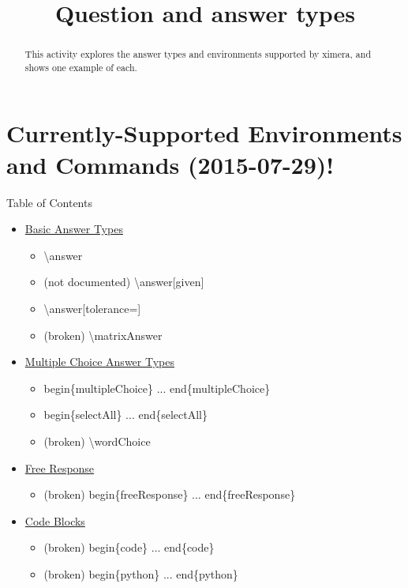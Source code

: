 \documentclass{ximera}
\title{Question and answer types}
\begin{document}
\begin{abstract}
  This activity explores the answer types and environments supported by ximera, and shows one example of each.
\end{abstract}

\maketitle

\section{Currently-Supported Environments and Commands (2015-07-29)!}

\begin{remark} Table of Contents

\begin{itemize}
\item \hyperref[BasicAnswerType]{Basic Answer Types}
  \begin{itemize}
    \item \textbackslash answer
    \item (not documented) \textbackslash answer[given]
    \item \textbackslash answer[tolerance=]
    \item (broken) \textbackslash matrixAnswer  
  \end{itemize}
\item \hyperref[MCAnswerType]{Multiple Choice Answer Types}
  \begin{itemize}
    \item begin\{multipleChoice\} ... end\{multipleChoice\}
    \item begin\{selectAll\} ... end\{selectAll\}
    \item (broken) \textbackslash wordChoice
  \end{itemize}    
\item \hyperref[FRAnswerType]{Free Response}
  \begin{itemize}   
    \item (broken) begin\{freeResponse\} ... end\{freeResponse\}
  \end{itemize}
\item \hyperref[CodeAnswers]{Code Blocks}
  \begin{itemize}
    \item (broken) begin\{code\} ... end\{code\}
    \item (broken) begin\{python\} ... end\{python\}
  \end{itemize}

\end{itemize}
\end{remark}
\end{document}
